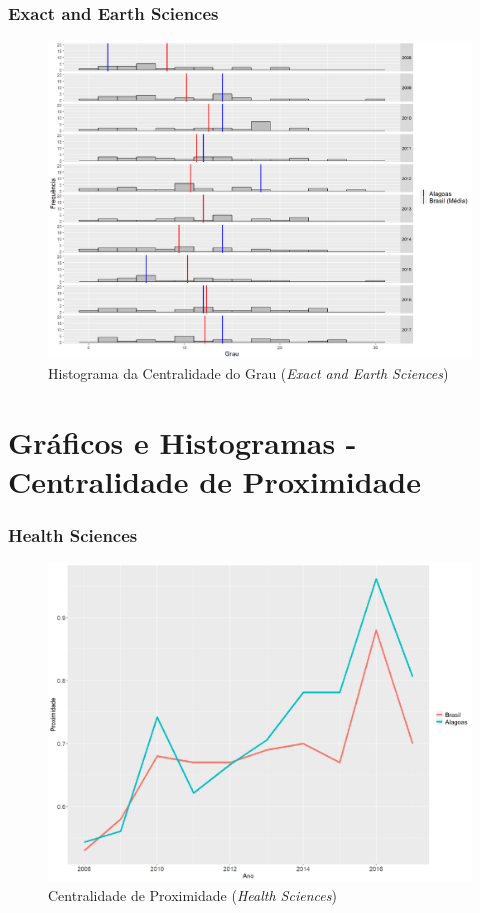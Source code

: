 \subsubsection{Exact and Earth Sciences}

\begin{figure}[H]
	\centering
	\includegraphics[scale=0.6]{Imagens/exact/degree-hist.pdf}
	\caption{Histograma da Centralidade do Grau (\textit{Exact and Earth Sciences})}
	\label{degree-exact-hist}
\end{figure}


\section{\textbf{Gráficos e Histogramas - Centralidade de Proximidade}}

\subsubsection{Health Sciences}

\begin{figure}[H]
	\centering
	\includegraphics[scale=0.6]{Imagens/graf-linha-closeness-br-al.pdf}
	\caption{Centralidade de Proximidade (\textit{Health Sciences})}
	\label{close-health}
\end{figure}

